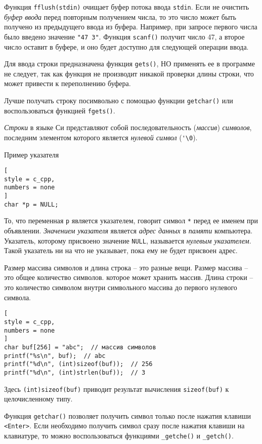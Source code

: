 \documentclass[%
	11pt,
	a4paper,
	utf8,
		]{article}
\begin{document}
Функция \verb*|fflush(stdin)| очищает буфер потока ввода \verb|stdin|. Если не очистить \emph{буфер ввода} перед повторным получением числа, то это число может быть получено из предыдущего ввода из буфера. Например, при запросе первого числа было введено значение \verb*|"47 3"|. Функция \verb|scanf()| получит число 47, а второе число оставит в буфере, и оно будет доступно для следующей операции ввода. 

Для ввода строки предназначена функция {\color{red}\verb*|gets()|, НО применять ее в программе не следует}, так как функция не производит никакой проверки длины строки, что может привести к переполнению буфера.

Лучше получать строку посимвольно с помощью функции \verb*|getchar()| или воспользоваться функцией \verb|fgets()|.

\emph{Строки} в языке Си представляют собой последовательность (\emph{массив}) \emph{символов}, последним элементом которого является \emph{нулевой символ} (\verb*|'\0|). 

Пример указателя
\begin{lstlisting}[
style = c_cpp,
numbers = none
]
char *p = NULL;
\end{lstlisting}

То, что переменная \verb|p| является указателем, говорит символ \verb*|*| перед ее именем при объявлении. \emph{Значением указателя} является \emph{адрес данных} в \emph{памяти} компьютера. Указатель, которому присвоено значение \verb|NULL|, называется \emph{нулевым указателем}. Такой указатель ни на что не указывает, пока ему не будет присвоен адрес.

Размер массива символов и длина строка -- это разные вещи. Размер массива -- это общее количество символов. которое может хранить массив. Длина строки -- это количество символом внутри символьного массива до первого нулевого символа.
\begin{lstlisting}[
style = c_cpp,
numbers = none
]
char buf[256] = "abc";  // массив символов
printf("%s\n", buf);  // abc
printf("%d\n", (int)sizeof(buf));  // 256
printf("%d\n", (int)strlen(buf));  // 3
\end{lstlisting}

Здесь \verb*|(int)sizeof(buf)| приводит результат вычисления \verb|sizeof(buf)| к целочисленному типу.

Функция \verb*|getchar()| позволяет получить символ только после нажатия клавиши \verb|<Enter>|. Если необходимо получить символ сразу после нажатия клавиши на клавиатуре, то можно воспользоваться функциями \verb*|_getche()| и \verb|_getch()|.
\end{document}
